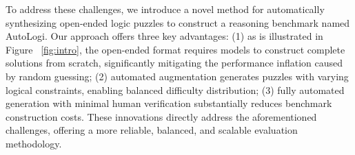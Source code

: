 To address these challenges, we introduce a novel method for automatically synthesizing open-ended logic puzzles to construct a reasoning benchmark named AutoLogi. Our approach offers three key advantages: (1) as is illustrated in Figure   ~\ref{fig:intro}, the open-ended format requires models to construct complete solutions from scratch, significantly mitigating the performance inflation caused by random guessing; (2) automated augmentation generates puzzles with varying logical constraints, enabling balanced difficulty distribution; (3) fully automated generation with minimal human verification substantially reduces benchmark construction costs. These innovations directly address the aforementioned challenges, offering a more reliable, balanced, and scalable evaluation methodology.





